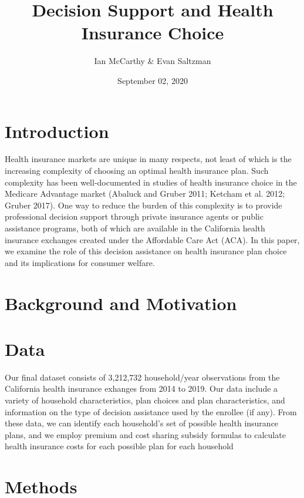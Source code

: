 \documentclass[
  12pt,
]{article}
\title{Decision Support and Health Insurance Choice}
\author{Ian McCarthy \& Evan Saltzman}
\date{September 02, 2020}
\begin{document}
\maketitle

\hypertarget{introduction}{%
\section{Introduction}\label{introduction}}

Health insurance markets are unique in many respects, not least of which is the increasing complexity of choosing an optimal health insurance plan. Such complexity has been well-documented in studies of health insurance choice in the Medicare Advantage market (Abaluck and Gruber 2011; Ketcham et al. 2012; Gruber 2017). One way to reduce the burden of this complexity is to provide professional decision support through private insurance agents or public assistance programs, both of which are available in the California health insurance exchanges created under the Affordable Care Act (ACA). In this paper, we examine the role of this decision assistance on health insurance plan choice and its implications for consumer welfare.

\hypertarget{background-and-motivation}{%
\section{Background and Motivation}\label{background-and-motivation}}

\hypertarget{data}{%
\section{Data}\label{data}}

Our final dataset consists of 3,212,732 household/year observations from the California health insurance exhanges from 2014 to 2019. Our data include a variety of household characteristics, plan choices and plan characteristics, and information on the type of decision assistance used by the enrollee (if any). From these data, we can identify each household's set of possible health insurance plans, and we employ premium and cost sharing subsidy formulas to calculate health insurance costs for each possible plan for each household

\hypertarget{methods}{%
\section{Methods}\label{methods}}
\end{document}
